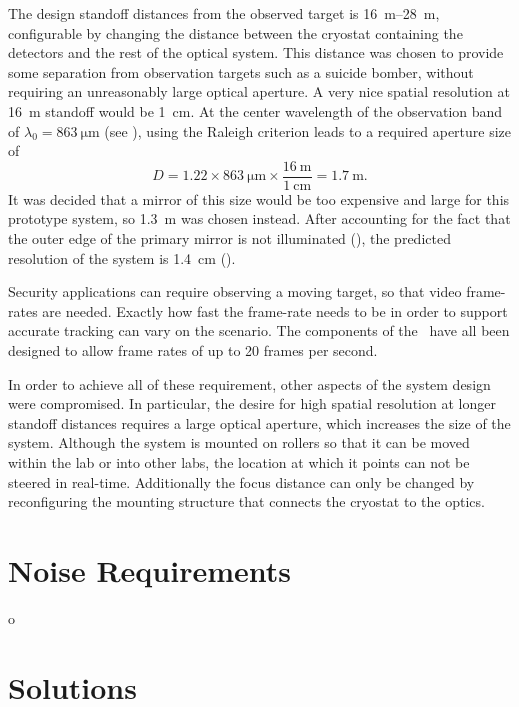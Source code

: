 The design standoff distances from the observed target is \SIrange{16}{28}{\m}, configurable by changing the distance between the cryostat containing the detectors and the rest of the optical system.
This distance was chosen to provide some separation from observation targets such as a suicide bomber, without requiring an unreasonably large optical aperture.
A very nice spatial resolution at \SI{16}{\m} standoff would be \SI{1}{\cm}.
At the center wavelength of the observation band of $\lambda_0 = \SI{863}{\um}$ (see ), using the Raleigh criterion  leads to a required aperture size of
\begin{equation}
  D = 1.22 \times \SI{863}{\um} \times \frac{\SI{16}{\m}}{\SI{1}{\cm}} = \SI{1.7}{\m}.
\end{equation}
It was decided that a mirror of this size would be too expensive and large for this prototype system, so \SI{1.3}{\m} was chosen instead.
After accounting for the fact that the outer edge of the primary mirror is not illuminated (), the predicted resolution of the system is \SI{1.4}{\cm} ().

Security applications can require observing a moving target, so that video frame-rates are needed.
Exactly how fast the frame-rate needs to be in order to support accurate tracking can vary on the scenario.
The components of the \Imager\ have all been designed to allow frame rates of up to 20 frames per second.

In order to achieve all of these requirement, other aspects of the system design were compromised.
In particular, the desire for high spatial resolution at longer standoff distances requires a large optical aperture, which increases the size of the system.
Although the system is mounted on rollers so that it can be moved within the lab or into other labs, the location at which it points can not be steered in real-time.
Additionally the focus distance can only be changed by reconfiguring the mounting structure that connects the cryostat to the optics.

\section{Noise Requirements} \label{sec:ch2-noise}
o

\section{Solutions}
